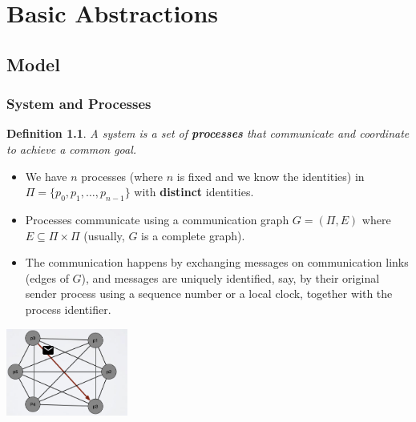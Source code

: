 \documentclass{book}
\newtheorem{definition}{Definition}
\begin{document}
\chapter{Basic Abstractions}
\section{Model}
\subsection{System and Processes}

\begin{definition}
    A system is a set of \textbf{processes} that communicate and coordinate to achieve a common goal.
\end{definition}
\begin{itemize}
    \item We have $n$ processes (where $n$ is fixed and we know the identities) in $\Pi = \{p_0, p_1, \ldots, p_{n-1}\}$ with \textbf{distinct} identities.
    \item Processes communicate using a communication graph $G = (\Pi, E)$ where $E \subseteq \Pi \times \Pi$ (usually, $G$ is a complete graph).
    \item The communication happens by exchanging messages on communication links (edges of $G$), and messages are uniquely identified, say, by their original sender process using a sequence number or a local clock, together with the process identifier.
\end{itemize}
\begin{center}
    \includegraphics[width=0.3\textwidth]{Immagini/1.png}
\end{center}
\end{document}
